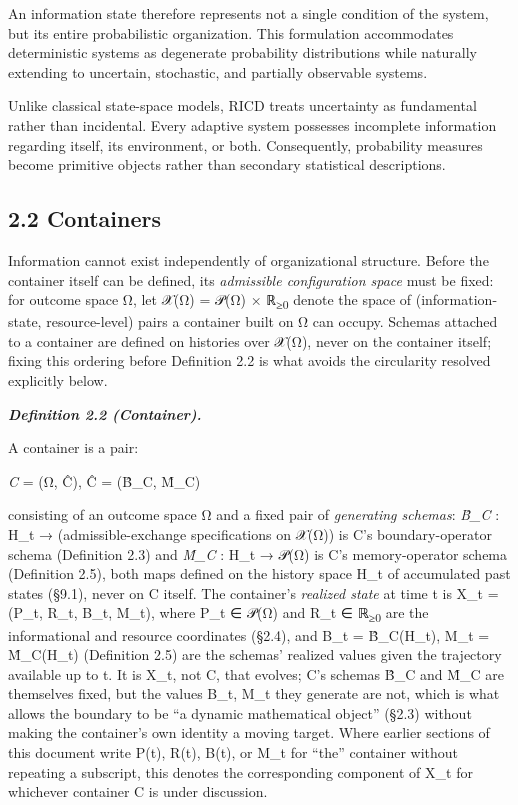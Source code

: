 \documentclass[
]{article}
\begin{document}
An information state therefore represents not a single condition of the
system, but its entire probabilistic organization. This formulation
accommodates deterministic systems as degenerate probability
distributions while naturally extending to uncertain, stochastic, and
partially observable systems.

Unlike classical state-space models, RICD treats uncertainty as
fundamental rather than incidental. Every adaptive system possesses
incomplete information regarding itself, its environment, or both.
Consequently, probability measures become primitive objects rather than
secondary statistical descriptions.

\hypertarget{containers}{%
\subsection{2.2 Containers}\label{containers}}

Information cannot exist independently of organizational structure.
Before the container itself can be defined, its \emph{admissible
configuration space} must be fixed: for outcome space Ω, let 𝒳(Ω) = 𝒫(Ω)
× ℝ\textsubscript{≥0} denote the space of (information-state,
resource-level) pairs a container built on Ω can occupy. Schemas
attached to a container are defined on histories over 𝒳(Ω), never on the
container itself; fixing this ordering before Definition 2.2 is what
avoids the circularity resolved explicitly below.

\emph{\textbf{Definition 2.2 (Container).}}

A container is a pair:

\emph{C} = (Ω, Ĉ), Ĉ = (B̂\_C, M̂\_C)

consisting of an outcome space Ω and a fixed pair of \emph{generating
schemas}: \emph{B̂\_C} : H\_t → (admissible-exchange specifications on
𝒳(Ω)) is C's boundary-operator schema (Definition 2.3) and \emph{M̂\_C} :
H\_t → 𝒫(Ω) is C's memory-operator schema (Definition 2.5), both maps
defined on the history space H\_t of accumulated past states (§9.1),
never on C itself. The container's \emph{realized state} at time t is
X\_t = (P\_t, R\_t, B\_t, M\_t), where P\_t ∈ 𝒫(Ω) and R\_t ∈
ℝ\textsubscript{≥0} are the informational and resource coordinates
(§2.4), and B\_t = B̂\_C(H\_t), M\_t = M̂\_C(H\_t) (Definition 2.5) are
the schemas' realized values given the trajectory available up to t. It
is X\_t, not C, that evolves; C's schemas B̂\_C and M̂\_C are themselves
fixed, but the values B\_t, M\_t they generate are not, which is what
allows the boundary to be ``a dynamic mathematical object'' (§2.3)
without making the container's own identity a moving target. Where
earlier sections of this document write P(t), R(t), B(t), or M\_t for
``the'' container without repeating a subscript, this denotes the
corresponding component of X\_t for whichever container C is under
discussion.
\end{document}
